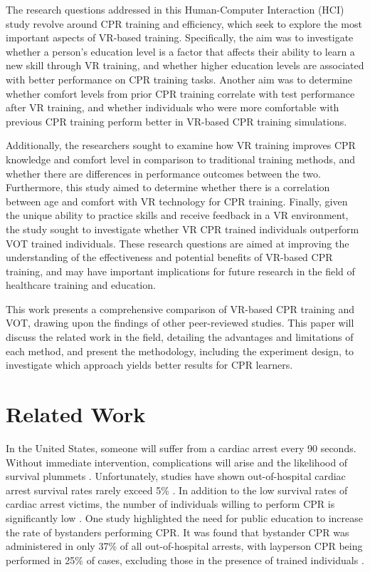 \documentclass[manuscript]{./Models/acmart}
\begin{document}
The research questions addressed in this Human-Computer Interaction (HCI) study revolve around CPR training and efficiency, which seek to explore the most important aspects of VR-based training. Specifically, the aim was to investigate whether a person's education level is a factor that affects their ability to learn a new skill through VR training, and whether higher education levels are associated with better performance on CPR training tasks. Another aim was to determine whether comfort levels from prior CPR training correlate with test performance after VR training, and whether individuals who were more comfortable with previous CPR training perform better in VR-based CPR training simulations.

Additionally, the researchers sought to examine how VR training improves CPR knowledge and comfort level in comparison to traditional training methods, and whether there are differences in performance outcomes between the two. Furthermore, this study aimed to determine whether there is a correlation between age and comfort with VR technology for CPR training. Finally, given the unique ability to practice skills and receive feedback in a VR environment, the study sought to investigate whether VR CPR trained individuals outperform VOT trained individuals. These research questions are aimed at improving the understanding of the effectiveness and potential benefits of VR-based CPR training, and may have important implications for future research in the field of healthcare training and education.

This work presents a comprehensive comparison of VR-based CPR training and VOT, drawing upon the findings of other peer-reviewed studies. This paper will discuss the related work in the field, detailing the advantages and limitations of each method, and present the methodology, including the experiment design, to investigate which approach yields  better results for CPR learners.

\section{Related Work}
In the United States, someone will suffer from a cardiac arrest every 90 seconds. Without immediate intervention, complications will arise and the likelihood of survival plummets \cite{cooper-2006}. Unfortunately, studies have shown out-of-hospital cardiac arrest survival rates rarely exceed 5\% \cite{vaillancourt-2008, ritter-1985, admin-2019}. In addition to the low survival rates of cardiac arrest victims, the number of individuals willing to perform CPR is significantly low \cite{abella-2008}. One study highlighted the need for public education to increase the rate of bystanders performing CPR. It was found that bystander CPR was administered in only 37\% of all out-of-hospital arrests, with layperson CPR being performed in 25\% of cases, excluding those in the presence of trained individuals \cite{bobrow-2011}.
\end{document}
